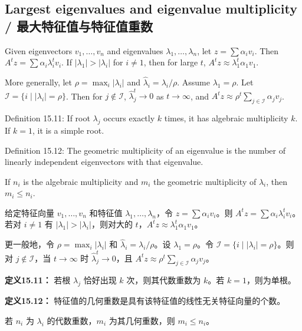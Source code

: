 \subsection{Largest eigenvalues and eigenvalue multiplicity / 最大特征值与特征值重数}

\begin{original}
Given eigenvectors $v_1, \dots, v_n$ and eigenvalues $\lambda_1, \dots, \lambda_n$, let $z = \sum \alpha_i v_i$. Then $A^t z = \sum \alpha_i \lambda_i^t v_i$. If $|\lambda_1| > |\lambda_i|$ for $i \neq 1$, then for large $t$, $A^t z \approx \lambda_1^t \alpha_1 v_1$.

More generally, let $\rho = \max_i |\lambda_i|$ and $\hat{\lambda}_i = \lambda_i/\rho$. Assume $\lambda_1 = \rho$. Let $\mathcal{I} = \{i \mid |\lambda_i| = \rho\}$. Then for $j \notin \mathcal{I}$, $\hat{\lambda}_j^t \to 0$ as $t \to \infty$, and $A^t z \approx \rho^t \sum_{j \in \mathcal{I}} \alpha_j v_j$.

Definition 15.11: If root $\lambda_j$ occurs exactly $k$ times, it has algebraic multiplicity $k$. If $k = 1$, it is a simple root.

Definition 15.12: The geometric multiplicity of an eigenvalue is the number of linearly independent eigenvectors with that eigenvalue.

If $n_i$ is the algebraic multiplicity and $m_i$ the geometric multiplicity of $\lambda_i$, then $m_i \le n_i$.
\end{original}
\begin{translation}
给定特征向量 $v_1, \dots, v_n$ 和特征值 $\lambda_1, \dots, \lambda_n$，令 $z = \sum \alpha_i v_i$。则 $A^t z = \sum \alpha_i \lambda_i^t v_i$。若对 $i \neq 1$ 有 $|\lambda_1| > |\lambda_i|$，则对大的 $t$，$A^t z \approx \lambda_1^t \alpha_1 v_1$。

更一般地，令 $\rho = \max_i |\lambda_i|$ 和 $\hat{\lambda}_i = \lambda_i/\rho$。设 $\lambda_1 = \rho$。令 $\mathcal{I} = \{i \mid |\lambda_i| = \rho\}$。则对 $j \notin \mathcal{I}$，当 $t \to \infty$ 时 $\hat{\lambda}_j^t \to 0$，且 $A^t z \approx \rho^t \sum_{j \in \mathcal{I}} \alpha_j v_j$。

\textbf{定义15.11：} 若根 $\lambda_j$ 恰好出现 $k$ 次，则其代数重数为 $k$。若 $k = 1$，则为单根。

\textbf{定义15.12：} 特征值的几何重数是具有该特征值的线性无关特征向量的个数。

若 $n_i$ 为 $\lambda_i$ 的代数重数，$m_i$ 为其几何重数，则 $m_i \le n_i$。
\end{translation}


